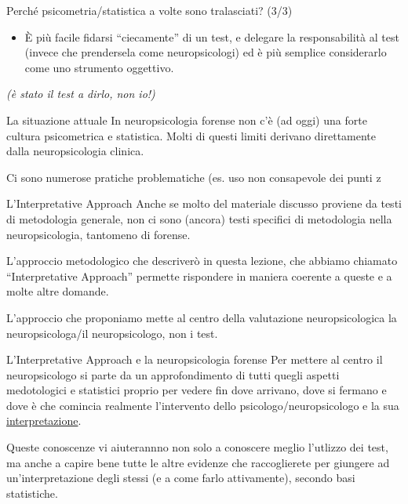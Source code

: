 \documentclass[
  ignorenonframetext,
]{beamer}
\providecommand{\tightlist}{%
  \setlength{\itemsep}{0pt}\setlength{\parskip}{0pt}}
\begin{document}
\begin{frame}{Perché psicometria/statistica a volte sono tralasciati?
(3/3)}
\label{perchuxe9-psicometriastatistica-a-volte-sono-tralasciati-33}
\begin{itemize}
\tightlist
\item
  È più facile fidarsi ``ciecamente'' di un test, e delegare la
  responsabilità al test (invece che prendersela come neuropsicologi) ed
  è più semplice considerarlo come uno strumento oggettivo.
\end{itemize}

\emph{(è stato il test a dirlo, non io!)}
\end{frame}

\begin{frame}{La situazione attuale}
\label{la-situazione-attuale}
In neuropsicologia forense non c'è (ad oggi) una forte cultura
psicometrica e statistica. Molti di questi limiti derivano direttamente
dalla neuropsicologia clinica.

Ci sono numerose pratiche problematiche (es. uso non consapevole dei
punti z
\end{frame}

\begin{frame}{L'Interpretative Approach}
\label{linterpretative-approach}
Anche se molto del materiale discusso proviene da testi di metodologia
generale, non ci sono (ancora) testi specifici di metodologia nella
neuropsicologia, tantomeno di forense.

L'approccio metodologico che descriverò in questa lezione, che abbiamo
chiamato ``Interpretative Approach'' permette rispondere in maniera
coerente a queste e a molte altre domande.

L'approccio che proponiamo mette al centro della valutazione
neuropsicologica la neuropsicologa/il neuropsicologo, non i test.
\end{frame}

\begin{frame}{L'Interpretative Approach e la neuropsicologia forense}
\label{linterpretative-approach-e-la-neuropsicologia-forense}
Per mettere al centro il neuropsicologo si parte da un approfondimento
di tutti quegli aspetti medotologici e statistici proprio per vedere fin
dove arrivano, dove si fermano e dove è che comincia realmente
l'intervento dello psicologo/neuropsicologo e la sua
\underline{interpretazione}.

Queste conoscenze vi aiuterannno non solo a conoscere meglio l'utlizzo
dei test, ma anche a capire bene tutte le altre evidenze che
raccoglierete per giungere ad un'interpretazione degli stessi (e a come
farlo attivamente), secondo basi statistiche.
\end{frame}
\end{document}
